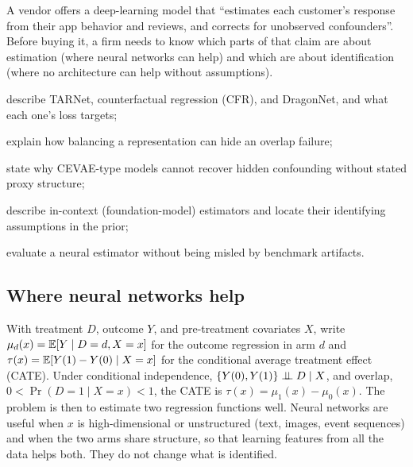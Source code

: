 \documentclass[11pt]{article}
\begin{document}

\begin{decision}
A vendor offers a deep-learning model that ``estimates each customer's response from their app behavior and
reviews, and corrects for unobserved confounders''. Before buying it, a firm needs to know which parts of that
claim are about estimation (where neural networks can help) and which are about identification (where no
architecture can help without assumptions).
\end{decision}

\begin{goals}
  \item describe TARNet, counterfactual regression (CFR), and DragonNet, and what each one's loss targets;
  \item explain how balancing a representation can hide an overlap failure;
  \item state why CEVAE-type models cannot recover hidden confounding without stated proxy structure;
  \item describe in-context (foundation-model) estimators and locate their identifying assumptions in the prior;
  \item evaluate a neural estimator without being misled by benchmark artifacts.
\end{goals}

\sectionone

\subsection{Where neural networks help}

With treatment $D$, outcome $Y$, and pre-treatment covariates $X$, write $\mu_d(x) = \mathbb{E}[Y \mid D=d, X=x]$ for the
outcome regression in arm $d$ and $\tau(x) = \mathbb{E}[Y(1) - Y(0) \mid X=x]$ for the conditional average treatment effect
(CATE). Under conditional independence, $\{Y(0), Y(1)\} \perp\!\!\!\perp D \mid X$, and overlap, $0 < \Pr(D=1 \mid X=x) < 1$,
the CATE is $\tau(x) = \mu_1(x) - \mu_0(x)$. The problem is then to estimate two regression functions well. Neural networks are
useful when $x$ is high-dimensional or unstructured (text, images, event sequences) and when the two arms
share structure, so that learning features from all the data helps both. They do not change what is identified.
\end{document}

